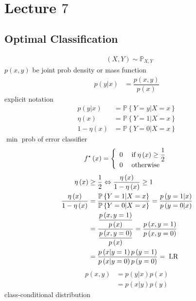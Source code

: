 \documentclass{article}
\begin{document}
\section{Lecture $7$} 


\subsection{Optimal Classification}
\begin{align*}
&\left(X , Y\right) \sim  \mathbb{P}_{X,Y}
\end{align*}
$p\left(x, y\right) $ be joint prob density or mass function
\begin{align*}
p\left(y | x\right)  &= \dfrac{p\left(x, y\right)}{p\left(x\right)}
\end{align*}
explicit notation
\begin{align*}
p\left(y | x\right)  &= \mathbb{P}\left\{Y = y | X = x\right\}
\\ \eta\left(x\right) &= \mathbb{P}\left\{Y = 1 | X = x\right\}
\\ 1 - \eta\left(x\right) &= \mathbb{P}\left\{Y = 0 | X = x\right\}
\end{align*}
$\displaystyle\min$ prob of error classifier
\[ f^\star \left(x\right) =\left\{ \begin{array}{ll}
0& \text{\;if\;} \eta\left(x\right) \geq  \dfrac{1}{2} \\
0& \text{\;otherwise\;} \\
\end{array}\right. \]
\begin{align*}
\eta\left(x\right) &\geq  \dfrac{1}{2} \Leftrightarrow  \dfrac{\eta\left(x\right)}{1 - \eta\left(x\right)} \geq  1
\\ \dfrac{\eta\left(x\right)}{1 - \eta\left(x\right)} &= \dfrac{\mathbb{P}\left\{Y = 1 | X = x\right\}}{\mathbb{P}\left\{Y = 0 | X = x\right\}} = \dfrac{p\left(y = 1 | x\right)}{p\left(y = 0 | x\right)}
\\ &= \dfrac{\dfrac{p\left(x, y = 1\right)}{p\left(x\right)}}{\dfrac{p\left(x, y = 0\right)}{p\left(x\right)}} = \dfrac{p\left(x, y = 1\right)}{p\left(x, y = 0\right)}
\\ &= \dfrac{p\left(x | y = 1\right) p\left(y = 1\right)}{p\left(x | y = 0\right) p\left(y = 0\right)} = \text{\;LR\;}
\end{align*}
\begin{align*}
p\left(x, y\right)  &= p\left(y | x\right) p\left(x\right) 
\\ &= p\left(x | y\right) p\left(y\right) 
\end{align*}
class-conditional distribution
\end{document}
